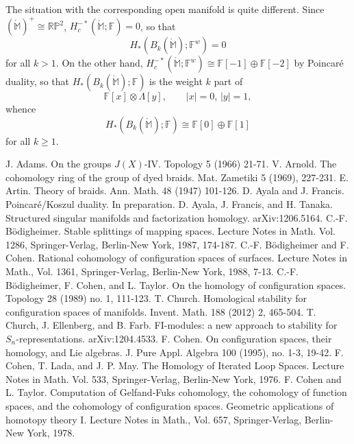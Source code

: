\documentclass{compositio}
\theoremstyle{definition}\newtheorem{definition}{Definition}[section]
\theoremstyle{theorem}\newtheorem{lemma}[definition]{Lemma}
\theoremstyle{remark}\newtheorem*{conventions}{Conventions}
\theoremstyle{remark}\newtheorem*{acknowledgments}{Acknowledgments}
\theoremstyle{remark}\newtheorem*{outline}{Outline}
\theoremstyle{remark}\newtheorem*{questions}{Questions}
\theoremstyle{remark}\newtheorem{example}[definition]{Example}
\theoremstyle{definition}\newtheorem{construction}[definition]{Construction}
\theoremstyle{definition}\newtheorem*{convention}{Convention}
\theoremstyle{definition}\newtheorem*{conjecture}{Conjecture}
\theoremstyle{theorem}\newtheorem{theorem}[definition]{Theorem}
\theoremstyle{theorem}\newtheorem{paradigm}[definition]{Paradigm}
\theoremstyle{remark}\newtheorem{remark}[definition]{Remark}
\theoremstyle{corollary}\newtheorem{corollary}[definition]{Corollary}
\theoremstyle{theorem}\newtheorem{proposition}[definition]{Proposition}
\theoremstyle{definition}\newtheorem{question}[definition]{Question}
\begin{document}
The situation with the corresponding open manifold is quite different. Since $(\mathring{\mathbb{M}})^+\cong\mathbb{RP}^2$, $H_c^{-*}(\mathring{\mathbb{M}};\mathbb{F})=0$, so that $$H_*(B_k(\mathring{\mathbb{M}});\mathbb{F}^w)=0$$ for all $k>1$. On the other hand, $H_c^{-*}(\mathring{\mathbb{M}};\mathbb{F}^w)\cong\mathbb{F}[-1]\oplus\mathbb{F}[-2]$ by Poincar\'{e} duality, so that $H_*(B_k(\mathring{\mathbb{M}});\mathbb{F})$ is the weight $k$ part of $$\mathbb{F}[x]\otimes\Lambda[y],\qquad |x|=0,\,| y|=1,$$ whence $$H_*(B_k(\mathring{\mathbb{M}});\mathbb{F})\cong \mathbb{F}[0]\oplus\mathbb{F}[1]$$ for all $k\geq1$.

\begin{thebibliography}{100}
 J. Adams. On the groups $J(X)$-IV. Topology 5 (1966) 21-71.
 V. Arnold. The cohomology ring of the group of dyed braids. Mat. Zametiki 5 (1969), 227-231.
 E. Artin. Theory of braids. Ann. Math. 48 (1947) 101-126.
 D. Ayala and J. Francis. Poincar\'{e}/Koszul duality. In preparation.
 D. Ayala, J. Francis, and H. Tanaka. Structured singular manifolds and factorization homology. arXiv:1206.5164.
 C.-F. B\"{o}digheimer. Stable splittings of mapping spaces. Lecture Notes in Math. Vol. 1286, Springer-Verlag, Berlin-New York, 1987, 174-187. 
 C.-F. B\"{o}digheimer and F. Cohen. Rational cohomology of configuration spaces of surfaces. Lecture Notes in Math., Vol. 1361, Springer-Verlag, Berlin-New York, 1988, 7-13.
 C.-F. B\"{o}digheimer, F. Cohen, and L. Taylor. On the homology of configuration spaces. Topology 28 (1989) no. 1, 111-123.
 T. Church. Homological stability for configuration spaces of manifolds. Invent. Math. 188 (2012) 2, 465-504.
 T. Church, J. Ellenberg, and B. Farb. FI-modules: a new approach to stability for $S_n$-representations. arXiv:1204.4533.
 F. Cohen. On configuration spaces, their homology, and Lie algebras. J. Pure Appl. Algebra 100 (1995), no. 1-3, 19-42.
 F. Cohen, T. Lada, and J. P. May. The Homology of Iterated Loop Spaces. Lecture Notes in Math. Vol. 533, Springer-Verlag, Berlin-New York, 1976.
 F. Cohen and L. Taylor. Computation of Gelfand-Fuks cohomology, the cohomology of function spaces, and the cohomology of configuration spaces. Geometric applications of homotopy theory I. Lecture Notes in Math., Vol. 657, Springer-Verlag, Berlin-New York, 1978.

\end{thebibliography}
\end{document}
